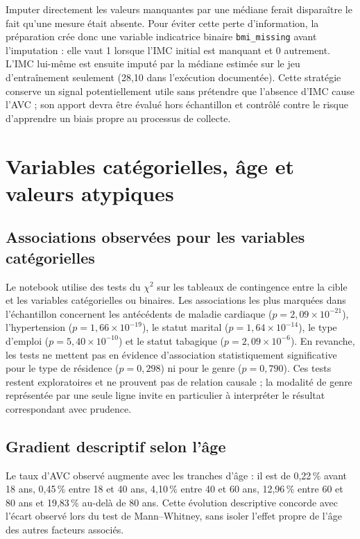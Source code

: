 Imputer directement les valeurs manquantes par une médiane ferait disparaître le fait qu'une mesure était absente. Pour éviter cette perte d'information, la préparation crée donc une variable indicatrice binaire \texttt{bmi\_missing} avant l'imputation : elle vaut 1 lorsque l'IMC initial est manquant et 0 autrement. L'IMC lui-même est ensuite imputé par la médiane estimée sur le jeu d'entraînement seulement (28,10 dans l'exécution documentée). Cette stratégie conserve un signal potentiellement utile sans prétendre que l'absence d'IMC cause l'AVC ; son apport devra être évalué hors échantillon et contrôlé contre le risque d'apprendre un biais propre au processus de collecte.

\section{Variables catégorielles, âge et valeurs atypiques}
\subsection{Associations observées pour les variables catégorielles}
Le notebook utilise des tests du $\chi^2$ sur les tableaux de contingence entre la cible et les variables catégorielles ou binaires. Les associations les plus marquées dans l'échantillon concernent les antécédents de maladie cardiaque ($p=2{,}09 \times 10^{-21}$), l'hypertension ($p=1{,}66 \times 10^{-19}$), le statut marital ($p=1{,}64 \times 10^{-14}$), le type d'emploi ($p=5{,}40 \times 10^{-10}$) et le statut tabagique ($p=2{,}09 \times 10^{-6}$). En revanche, les tests ne mettent pas en évidence d'association statistiquement significative pour le type de résidence ($p=0{,}298$) ni pour le genre ($p=0{,}790$). Ces tests restent exploratoires et ne prouvent pas de relation causale ; la modalité de genre représentée par une seule ligne invite en particulier à interpréter le résultat correspondant avec prudence.

\subsection{Gradient descriptif selon l'âge}
Le taux d'AVC observé augmente avec les tranches d'âge : il est de 0,22\,\% avant 18 ans, 0,45\,\% entre 18 et 40 ans, 4,10\,\% entre 40 et 60 ans, 12,96\,\% entre 60 et 80 ans et 19,83\,\% au-delà de 80 ans. Cette évolution descriptive concorde avec l'écart observé lors du test de Mann--Whitney, sans isoler l'effet propre de l'âge des autres facteurs associés.

